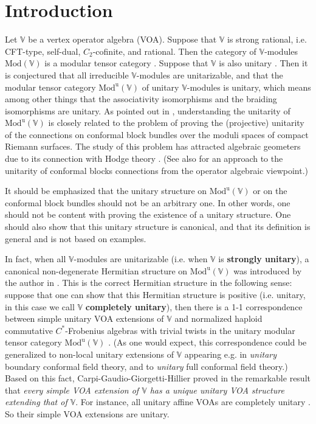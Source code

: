 \documentclass[11pt,b5paper,notitlepage]{article}
\theoremstyle{definition}
\theoremstyle{plain}
\newcommand{\uni}{\mathrm{u}}
\newcommand{\Vbb}{\mathbb V}
\newcommand{\Mod}{\mathrm{Mod}}
\numberwithin{equation}{section}
\begin{document}
\tableofcontents



	



\section{Introduction}



Let $\Vbb$ be a vertex operator algebra (VOA). Suppose that $\Vbb$ is strong rational, i.e. CFT-type, self-dual, $C_2$-cofinite, and rational. Then the category of $\Vbb$-modules $\Mod(\Vbb)$ is a modular tensor category \cite{Hua08}. Suppose that $\Vbb$ is also unitary \cite{DL14,CKLW18}. Then it is conjectured that all irreducible $\Vbb$-modules are unitarizable, and that the modular tensor category $\Mod^\uni(\Vbb)$ of unitary $\Vbb$-modules is unitary, which means among other things that the associativity isomorphisms and the braiding isomorphisms are unitary. As pointed out in \cite{Kir98}, understanding the unitarity of $\Mod^\uni(\Vbb)$ is closely related to the problem of proving the (projective) unitarity of the connections on conformal block bundles over the moduli spaces of compact Riemann surfaces. The study of this problem has attracted algebraic geometers due to its connection with Hodge theory \cite{Ram09,Loo09,Bel12,Loo21}. (See also \cite{BDH17} for an approach to the unitarity of conformal blocks connections from the operator algebraic viewpoint.)



It should be emphasized that the unitary structure on $\Mod^\uni(\Vbb)$ or on the conformal block bundles should not be an arbitrary one. In other words, one should not be content with proving the existence of a unitary structure. One should also show that this unitary structure is canonical, and that its definition is general and is not based on examples.

In fact, when all $\Vbb$-modules are unitarizable (i.e. when $\Vbb$ is \textbf{strongly unitary}), a canonical non-degenerate Hermitian structure on $\Mod^\uni(\Vbb)$ was introduced by the author in \cite{Gui19b}. This is the correct Hermitian structure in the following sense: suppose that one can show that this Hermitian structure is positive (i.e. unitary, in this case we call $\Vbb$ \textbf{completely unitary}), then there is a 1-1 correspondence between simple unitary VOA extensions of $\Vbb$ and normalized haploid commutative $C^*$-Frobenius algebras with trivial twists in the unitary modular tensor category $\Mod^\uni(\Vbb)$ \cite{Gui22}. (As one would expect, this correspondence could be generalized to non-local unitary extensions of $\Vbb$ appearing e.g. in \emph{unitary} boundary conformal field theory, and to \emph{unitary}  full conformal field theory.) Based on this fact, Carpi-Gaudio-Giorgetti-Hillier proved in \cite[Thm. 4.7]{CGGH23} the remarkable result that \emph{every simple VOA extension of $\Vbb$ has a unique unitary VOA structure extending that of $\Vbb$}. For instance, all unitary affine VOAs are completely unitary \cite{Gui19b,Gui19c,Ten19c}. So their simple VOA extensions are unitary.
\end{document}
